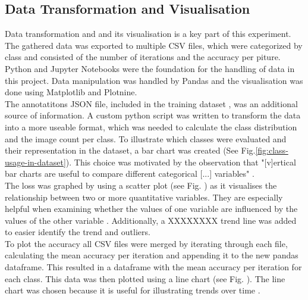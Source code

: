 \subsection{Data Transformation and Visualisation}
Data transformation and and its visualisation is a key part of this experiment. The gathered data was exported to multiple CSV files, 
which were categorized by class and consisted of the number of iterations and the accuracy per piture. Python and Jupyter Notebooks were the
foundation for the handling of data in this project. Data manipulation was handled by Pandas and the visualisation was done using Matplotlib
and Plotnine.\\
The annotatitons JSON file, included in the training dataset \parencite{pascal2023}, was an additional source of information. 
A custom python script was written to transform the data into a more useable format, which was needed to calculate the class distribution 
and the image count per class. To illustrate which classes were evaluated and their representation in the dataset, a bar chart was created 
(See Fig.\ref{fig:class-usage-in-dataset}). This choice was motivated by the observation that "[v]ertical bar charts are useful to compare 
different categorical [...] variables" \parencite{Statistics-Canada2021}.\\
The loss was graphed by using a scatter plot (see Fig. %
) as it visualises the relationship between two or more quantitative variables. They are especially helpful when examining whether
the values of one variable are influenced by the values of the other variable \parencite{Statistics-Canada2021b}. 
Additionally, a XXXXXXXX trend line was added to easier identify the trend and outliers.\\
To plot the accuracy all CSV files were merged by iterating through each file, calculating the mean accuracy per iteration and appending it
to the new pandas dataframe. This resulted in a dataframe with the mean accuracy per iteration for each class. This data was then plotted using
a line chart (see Fig. %
). The line chart was chosen because it is useful for illustrating trends over time \parencite{Statistics-Canada2021a}.\\


